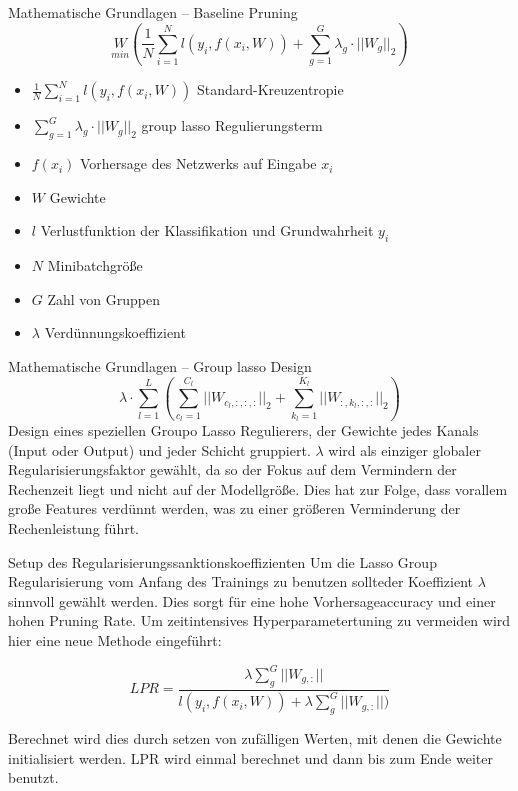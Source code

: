 \documentclass[10pt]{beamer}
\begin{document}
\begin{frame}{Mathematische Grundlagen -- Baseline Pruning}
 $$ \underset{min}{W} \left( \frac{1}{N} \sum_{i=1}^{N} l(y_i,f(x_i, W)) + \sum_{g=1}^{G} \lambda_g \cdot || W_g ||_2 \right) $$
 \begin{itemize}
  \item $ \frac{1}{N} \sum_{i=1}^{N} l(y_i,f(x_i, W))$ Standard-Kreuzentropie
  \item $\sum_{g=1}^{G} \lambda_g \cdot || W_g ||_2 $ group lasso Regulierungsterm
  \item $f(x_i)$ Vorhersage des Netzwerks auf Eingabe $x_i$
  \item $W$ Gewichte
  \item $l$ Verlustfunktion der Klassifikation und Grundwahrheit $y_i$
  \item $N$ Minibatchgröße
  \item $G$ Zahl von Gruppen
  \item $\lambda$ Verdünnungskoeffizient
 \end{itemize}

\end{frame}




\begin{frame}{Mathematische Grundlagen -- Group lasso Design}
$$ \lambda \cdot \sum_{l=1}^{L} \left( \sum_{c_l=1}^{C_l} || W_{c_l,:,:,:} ||_2 + \sum_{k_l=1}^{K_l} || W_{:,k_l,:,:}||_2 \right) $$ 
Design eines speziellen Groupo Lasso Regulierers, der Gewichte jedes Kanals (Input oder Output) und jeder Schicht gruppiert. $\lambda$ wird als einziger globaler Regularisierungsfaktor gewählt, da so der Fokus auf dem Vermindern der Rechenzeit liegt und nicht auf der Modellgröße. Dies hat zur Folge, dass vorallem große Features verdünnt werden, was zu einer größeren Verminderung der Rechenleistung führt.
\end{frame}


\begin{frame}{Setup des Regularisierungssanktionskoeffizienten}
 Um die Lasso Group Regularisierung vom Anfang des Trainings zu benutzen sollteder Koeffizient $\lambda$ sinnvoll gewählt werden. Dies sorgt für eine hohe Vorhersageaccuracy und einer hohen Pruning Rate. Um zeitintensives Hyperparametertuning zu vermeiden wird hier eine neue Methode eingeführt:
 
 $$LPR=\frac{\lambda \sum_{g}^{G}|| W_{g,:} ||}{l(y_i,f(x_i,W))+\lambda \sum_{g}^{G}||W_{g,:} ||)} $$
 
 Berechnet wird dies durch setzen von zufälligen Werten, mit denen die Gewichte initialisiert werden. LPR wird einmal berechnet und dann bis zum Ende weiter benutzt.
\end{frame}
\end{document}
